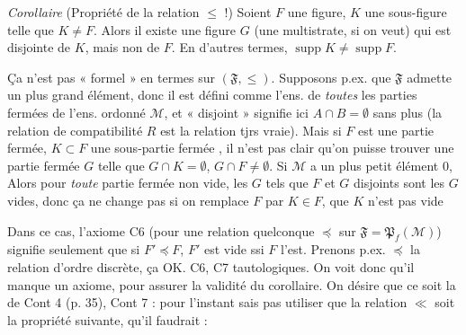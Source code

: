 \documentclass[11pt,a4paper]{article}
\begin{document}
\emph{Corollaire} (Propriété de la relation $\leq$ !) \quad Soient $F$ une figure, $K$ une sous-figure \struck{\ill{}} telle que $K \neq F$. Alors il existe une \struck{\ill{}} figure $G$ (une multistrate, si on veut) qui est  disjointe de $K$, mais non de $F$. \struck{\ill{}} En d'autres termes, $\operatorname{supp} K \neq \operatorname{supp} F$.

Ça n'est pas « formel » en termes  sur $(\mathfrak{F}, \leq)$. Supposons p.ex. que $\mathfrak{F}$ admette un plus grand élément, donc il est défini comme l'ens. de \emph{toutes} les parties fermées de l'ens. ordonné $\mathcal{M}$, et « disjoint » signifie ici $A \cap B = \emptyset$ sans plus (la relation de compatibilité $R$ est la relation tjrs vraie). Mais si $F$ est une partie fermée, $K \subset F$ une sous-partie fermée , il n'est pas clair qu'on puisse trouver une partie fermée $G$ telle que $G \cap K = \emptyset$, $G \cap F \neq \emptyset$.  Si $\mathcal{M}$ a un plus petit élément $0$,  Alors pour \emph{toute} partie fermée non vide, les $G$ tels que $F$ et $G$ disjoints sont les $G$ vides, donc ça ne change pas si on remplace $F$ par $K \in F$, \struck{\ill{}}  que $K$ n'est pas vide

Dans ce cas, l'axiome C6 (pour une relation  quelconque $\preccurlyeq$ sur $\mathfrak{F} = \mathfrak{P}_f(\mathcal{M})$) signifie seulement que si $F' \preccurlyeq F$, $F'$ est vide ssi $F$ l'est. Prenons p.ex. \struck{\ill{}} $\preccurlyeq$  la relation d'ordre discrète, ça OK.  C6, C7 tautologiques. On voit donc qu'il manque un axiome, pour assurer la validité du corollaire. On désire que ce soit la \ill{} de Cont 4 (p. 35), \add{\ill{}} Cont 7 : \ill{} pour l'instant \ill{} sais pas utiliser que la relation $\ll$ soit \ill{} \ill{} la propriété suivante, qu'il faudrait \ill{} \ill{} \ill{} :

\end{document}
